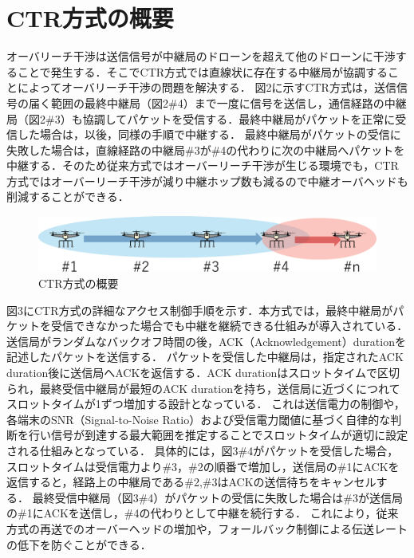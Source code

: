 \documentclass[a4paper,10pt]{ltjsarticle}
\begin{document}
\section{CTR方式の概要}
オーバリーチ干渉は送信信号が中継局のドローンを超えて他のドローンに干渉することで発生する．そこでCTR方式では直線状に存在する中継局が協調することによってオーバリーチ干渉の問題を解決する．
図2に示すCTR方式は，送信信号の届く範囲の最終中継局（図2\#4）まで一度に信号を送信し，通信経路の中継局（図2\#3）も協調してパケットを受信する．最終中継局がパケットを正常に受信した場合は，以後，同様の手順で中継する．
最終中継局がパケットの受信に失敗した場合は，直線経路の中継局\#3が\#4の代わりに次の中継局へパケットを中継する．そのため従来方式ではオーバーリーチ干渉が生じる環境でも，CTR方式ではオーバーリーチ干渉が減り中継ホップ数も減るので中継オーバヘッドも削減することができる．
\begin{figure}[H]
  \centering
  \includegraphics[width=\linewidth]{CTR_topology.pdf} 
  \caption{CTR方式の概要}
  \label{fig:CTR方式のトポロジー} 
\end{figure}
図3にCTR方式の詳細なアクセス制御手順を示す．本方式では，最終中継局がパケットを受信できなかった場合でも中継を継続できる仕組みが導入されている．送信局がランダムなバックオフ時間の後，ACK（Acknowledgement）durationを記述したパケットを送信する．
パケットを受信した中継局は，指定されたACK duration後に送信局へACKを返信する．ACK durationはスロットタイムで区切られ，最終受信中継局が最短のACK durationを持ち，送信局に近づくにつれてスロットタイムが1ずつ増加する設計となっている．
これは送信電力の制御や，各端末のSNR（Signal-to-Noise Ratio）および受信電力閾値に基づく自律的な判断を行い信号が到達する最大範囲を推定することでスロットタイムが適切に設定される仕組みとなっている．
具体的には，図3\#4がパケットを受信した場合，スロットタイムは受信電力より\#3，\#2の順番で増加し，送信局の\#1にACKを返信すると，経路上の中継局である\#2,\#3はACKの送信待ちをキャンセルする．
最終受信中継局（図3\#4）がパケットの受信に失敗した場合は\#3が送信局の\#1にACKを送信し，\#4の代わりとして中継を続行する．
これにより，従来方式の再送でのオーバーヘッドの増加や，フォールバック制御による伝送レートの低下を防ぐことができる．
\end{document}
